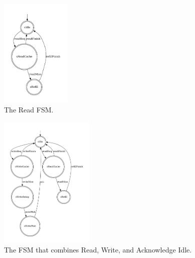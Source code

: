 \documentclass[conference]{IEEEtran}
\begin{document}
\begin{figure}[ht]
    \centering
    \includegraphics[width=0.3\textwidth]{isca2023-latex-template/figures/readFSM.pdf}
    \caption{The Read FSM.}
    \label{fig:readFSM}
\end{figure}

\begin{figure}[ht]
    \centering
    \includegraphics[width=0.4\textwidth]{isca2023-latex-template/figures/writeThroughFSM.pdf}
    \caption{The FSM that combines Read, Write, and Acknowledge Idle.}
    \label{fig:writeThroughFSM}
\end{figure}
\end{document}
